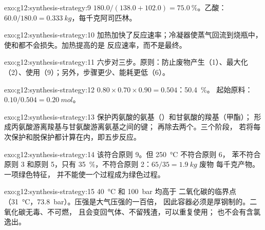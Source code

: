 \begin{solution}{exo:g12:synthesis-strategy:9}
$180.0/(138.0 + 102.0) = \qty{75.0}{\percent}$。乙酸：
$60.0/180.0 = \qty{0.333}{kg}$，每千克阿司匹林。
\end{solution}

\begin{solution}{exo:g12:synthesis-strategy:10}
加热加快了反应速率；冷凝器使蒸气回流到烧瓶中，
使和都不会损失。加热提高的是
反应速率，而不是最终。
\end{solution}

\begin{solution}{exo:g12:synthesis-strategy:11}
六步对三步。原则：防止废物产生（1）、最大化
（2）、使用（9）；另外，步骤更少、能耗更低（6）。
\end{solution}

\begin{solution}{exo:g12:synthesis-strategy:12}
$0.80 \times 0.70 \times 0.90 = 0.504$：\qty{50.4}{\percent}。
起始原料：$0.10/0.504 = \qty{0.20}{mol}$。
\end{solution}

\begin{solution}{exo:g12:synthesis-strategy:13}
保护丙氨酸的氨基（）和甘氨酸的羧基（甲酯）；
形成丙氨酸游离羧基与甘氨酸游离氨基之间的键；
再除去两个。三个阶段，
若将每次保护和脱保护都计算在内，即五步反应。
\end{solution}

\begin{solution}{exo:g12:synthesis-strategy:14}
该符合原则 9。但 \qty{250}{\celsius} 不符合原则 6，
苯不符合原则 3 和原则 5，只有
\qty{35}{\percent}，不符合原则 2：$65/35 = \qty{1.9}{kg}$ 废物
每千克产物。一项绿色特征，
并不能使一个过程成为绿色过程。
\end{solution}

\begin{solution}{exo:g12:synthesis-strategy:15}
\qty{40}{\celsius} 和 \qty{100}{bar} 均高于
二氧化碳的临界点（\qty{31}{\celsius}，\qty{73.8}{bar}）。压强是大气压强的一百倍，
因此容器必须是厚钢制的。二氧化碳无毒、不可燃，
且会变回气体、不留残渣，可以重复使用；
也不会有含氯逸出。
\end{solution}

